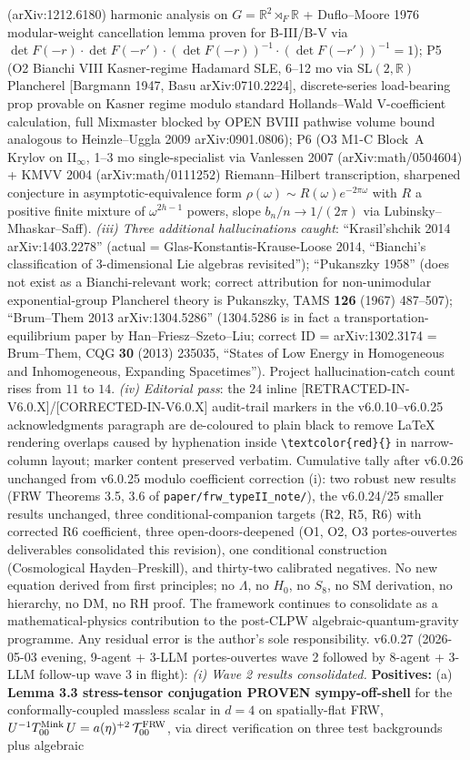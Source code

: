 \documentclass[reprint,amsmath,amssymb,aps,prd,superscriptaddress]{revtex4-2}
\providecommand{\R}{\mathbb{R}}
\providecommand{\1}{\mathbf{1}}
\begin{document}
(arXiv:1212.6180) harmonic analysis on $G=\R^2\rtimes_F\R$ + Duflo--Moore 1976 modular-weight cancellation lemma proven for B-III/B-V via $\det F(-r)\cdot\det F(-r')\cdot(\det F(-r))^{-1}\cdot(\det F(-r'))^{-1}=1$); P5 (O2 Bianchi VIII Kasner-regime Hadamard SLE, 6--12 mo via SL$(2,\R)$ Plancherel [Bargmann 1947, Basu arXiv:0710.2224], discrete-series load-bearing prop provable on Kasner regime modulo standard Hollands--Wald V-coefficient calculation, full Mixmaster blocked by OPEN BVIII pathwise volume bound analogous to Heinzle--Uggla 2009 arXiv:0901.0806); P6 (O3 M1-C Block~A Krylov on II$_\infty$, 1--3 mo single-specialist via Vanlessen 2007 (arXiv:math/0504604) + KMVV 2004 (arXiv:math/0111252) Riemann--Hilbert transcription, sharpened conjecture in asymptotic-equivalence form $\rho(\omega)\sim R(\omega)e^{-2\pi\omega}$ with $R$ a positive finite mixture of $\omega^{2h-1}$ powers, slope $b_n/n\to 1/(2\pi)$ via Lubinsky--Mhaskar--Saff). \emph{(iii) Three additional hallucinations caught}: ``Krasil'shchik 2014 arXiv:1403.2278'' (actual = Glas-Konstantis-Krause-Loose 2014, ``Bianchi's classification of $3$-dimensional Lie algebras revisited''); ``Pukanszky 1958'' (does not exist as a Bianchi-relevant work; correct attribution for non-unimodular exponential-group Plancherel theory is Pukanszky, TAMS \textbf{126} (1967) 487--507); ``Brum--Them 2013 arXiv:1304.5286'' (1304.5286 is in fact a transportation-equilibrium paper by Han--Friesz--Szeto--Liu; correct ID = arXiv:1302.3174 = Brum--Them, CQG \textbf{30} (2013) 235035, ``States of Low Energy in Homogeneous and Inhomogeneous, Expanding Spacetimes''). Project hallucination-catch count rises from $11$ to $14$. \emph{(iv) Editorial pass}: the $24$ inline [RETRACTED-IN-V6.0.X]/[CORRECTED-IN-V6.0.X] audit-trail markers in the v6.0.10--v6.0.25 acknowledgments paragraph are de-coloured to plain black to remove LaTeX rendering overlaps caused by hyphenation inside \texttt{\textbackslash textcolor\{red\}\{\}} in narrow-column layout; marker content preserved verbatim. Cumulative tally after v6.0.26 unchanged from v6.0.25 modulo coefficient correction (i): two robust new results (FRW Theorems 3.5, 3.6 of \texttt{paper/frw\_typeII\_note/}), the v6.0.24/25 smaller results unchanged, three conditional-companion targets (R2, R5, R6) with corrected R6 coefficient, three open-doors-deepened (O1, O2, O3 portes-ouvertes deliverables consolidated this revision), one conditional construction (Cosmological Hayden--Preskill), and thirty-two calibrated negatives. No new equation derived from first principles; no $\Lambda$, no $H_0$, no $S_8$, no SM derivation, no hierarchy, no DM, no RH proof. The framework continues to consolidate as a mathematical-physics contribution to the post-CLPW algebraic-quantum-gravity programme. Any residual error is the author's sole responsibility. v6.0.27 (2026-05-03 evening, 9-agent + 3-LLM portes-ouvertes wave 2 followed by 8-agent + 3-LLM follow-up wave 3 in flight): \emph{(i) Wave 2 results consolidated.} \textbf{Positives:} (a) \textbf{Lemma 3.3 stress-tensor conjugation PROVEN sympy-off-shell} for the conformally-coupled massless scalar in $d{=}4$ on spatially-flat FRW, $U^{-1} T^{\rm Mink}_{00}\,U = a(\eta)^{+2}\,\mathcal{T}^{\rm FRW}_{00}$, via direct verification on three test backgrounds plus algebraic 
\end{document}
